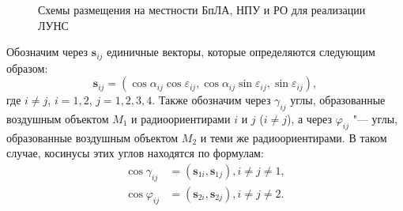 \documentclass[a4paper,12pt]{article}
\begin{document}
\begin{figure}[htbp]
    \begin{center}


    \caption{Схемы размещения на местности БпЛА, НПУ и РО для реализации ЛУНС}
    \label{figure:pic2}
    \end{center}
\end{figure}

Обозначим через $\mathbf{s}_{ij}$ единичные векторы, которые определяются следующим образом:
\begin{equation}
    \mathbf{s}_{ij} = \left(\cos\alpha_{ij} \cos\varepsilon_{ij}, \cos\alpha_{ij} \sin\varepsilon_{ij}, \sin\varepsilon_{ij}\right),
\end{equation}
где $i \ne j$, $i = 1,2$, $j = 1,2,3,4$. Также обозначим через $\gamma_{ij}$ углы, образованные воздушным объектом $M_1$ и
радиоориентирами $i$ и $j$ ($i \ne j$), а через $\varphi_{ij}$ "--- углы, образованные воздушным объектом $M_2$ и теми же
радиоориентирами. В таком случае, косинусы этих углов находятся по формулам:
\begin{align*}
    \cos\gamma_{ij} &= \left(\mathbf{s}_{1i}, \mathbf{s}_{1j}\right), i \ne j \ne 1, \\
    \cos\varphi_{ij} &= \left(\mathbf{s}_{2i}, \mathbf{s}_{2j}\right), i \ne j \ne 2.
\end{align*}
\end{document}
